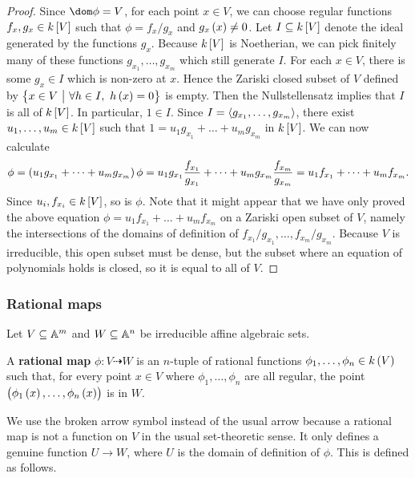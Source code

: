 \begin{proof}
Since $ \dom \phi = V $, for each point $ x \in V $, we can choose regular functions $ f_x, g_x \in k\sbr{V} $ such that $ \phi = f_x / g_x $ and $ g_x\br{x} \ne 0 $. Let $ I \subseteq k\sbr{V} $ denote the ideal generated by the functions $ g_x $. Because $ k\sbr{V} $ is Noetherian, we can pick finitely many of these functions $ g_{x_1}, \dots, g_{x_m} $ which still generate $ I $. For each $ x \in V $, there is some $ g_x \in I $ which is non-zero at $ x $. Hence the Zariski closed subset of $ V $ defined by $ \cbr{x \in V \st \forall h \in I, \ h\br{x} = 0} $ is empty. Then the Nullstellensatz implies that $ I $ is all of $ k\sbr{V} $. In particular, $ 1 \in I $. Since $ I = \abr{g_{x_1}, \dots, g_{x_m}} $, there exist $ u_1, \dots, u_m \in k\sbr{V} $ such that $ 1 = u_1g_{x_1} + \dots + u_mg_{x_m} $ in $ k\sbr{V} $. We can now calculate
$$ \phi = \br{u_1g_{x_1} + \dots + u_mg_{x_m}}\phi = u_1g_{x_1}\dfrac{f_{x_1}}{g_{x_1}} + \dots + u_mg_{x_m}\dfrac{f_{x_m}}{g_{x_m}} = u_1f_{x_1} + \dots + u_mf_{x_m}. $$
Since $ u_i, f_{x_i} \in k\sbr{V} $, so is $ \phi $. Note that it might appear that we have only proved the above equation $ \phi = u_1f_{x_1} + \dots + u_mf_{x_m} $ on a Zariski open subset of $ V $, namely the intersections of the domains of definition of $ f_{x_1} / g_{x_1}, \dots, f_{x_m} / g_{x_m} $. Because $ V $ is irreducible, this open subset must be dense, but the subset where an equation of polynomials holds is closed, so it is equal to all of $ V $.
\end{proof}

\subsubsection{Rational maps}

Let $ V \subseteq \AA^m $ and $ W \subseteq \AA^n $ be irreducible affine algebraic sets.

\begin{definition*}
A \textbf{rational map} $ \phi : V \dashrightarrow W $ is an $ n $-tuple of rational functions $ \phi_1, \dots, \phi_n \in k\br{V} $ such that, for every point $ x \in V $ where $ \phi_1, \dots, \phi_n $ are all regular, the point $ \br{\phi_1\br{x}, \dots, \phi_n\br{x}} $ is in $ W $.
\end{definition*}

We use the broken arrow symbol instead of the usual arrow because a rational map is not a function on $ V $ in the usual set-theoretic sense. It only defines a genuine function $ U \to W $, where $ U $ is the domain of definition of $ \phi $. This is defined as follows.

